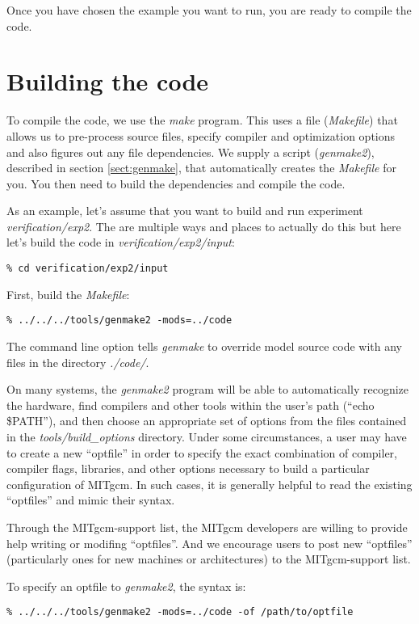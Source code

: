 Once you have chosen the example you want to run, you are ready to compile
the code.

\section{Building the code}
\label{sect:buildingCode}

To compile the code, we use the {\em make} program. This uses a file
({\em Makefile}) that allows us to pre-process source files, specify
compiler and optimization options and also figures out any file
dependencies. We supply a script ({\em genmake2}), described in
section \ref{sect:genmake}, that automatically creates the {\em
  Makefile} for you. You then need to build the dependencies and
compile the code.

As an example, let's assume that you want to build and run experiment
\textit{verification/exp2}. The are multiple ways and places to
actually do this but here let's build the code in
\textit{verification/exp2/input}:
\begin{verbatim}
% cd verification/exp2/input
\end{verbatim}
First, build the {\em Makefile}:
\begin{verbatim}
% ../../../tools/genmake2 -mods=../code
\end{verbatim}
The command line option tells {\em genmake} to override model source
code with any files in the directory {\em ./code/}.

On many systems, the {\em genmake2} program will be able to
automatically recognize the hardware, find compilers and other tools
within the user's path (``echo \$PATH''), and then choose an
appropriate set of options from the files contained in the {\em
  tools/build\_options} directory.  Under some circumstances, a user
may have to create a new ``optfile'' in order to specify the exact
combination of compiler, compiler flags, libraries, and other options
necessary to build a particular configuration of MITgcm.  In such
cases, it is generally helpful to read the existing ``optfiles'' and
mimic their syntax.

Through the MITgcm-support list, the MITgcm developers are willing to
provide help writing or modifing ``optfiles''.  And we encourage users
to post new ``optfiles'' (particularly ones for new machines or
architectures) to the MITgcm-support list.

To specify an optfile to {\em genmake2}, the syntax is:
\begin{verbatim}
% ../../../tools/genmake2 -mods=../code -of /path/to/optfile
\end{verbatim}

